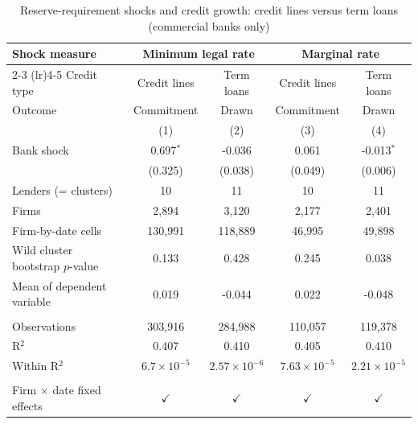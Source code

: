 
\begin{table}[!h]
   \centering
   \small
   \begin{threeparttable}[b]
      \caption{\label{tab:encaje_loan_growth_banks} Reserve-requirement shocks and credit growth: credit lines versus term loans (commercial banks only)}
      \bigskip
      \begin{tabular}{lcccc}
         \toprule
         Shock measure & \multicolumn{2}{c}{Minimum legal rate} & \multicolumn{2}{c}{Marginal rate} \\ 
         \cmidrule(lr){2-3} \cmidrule(lr){4-5}
         Credit type                       & Credit lines         & Term loans            & Credit lines          & Term loans \\   
         Outcome                           & Commitment           & Drawn                 & Commitment            & Drawn \\   
                                           & (1)                  & (2)                   & (3)                   & (4)\\  
         \midrule 
         Bank shock                        & 0.697$^{*}$          & -0.036                & 0.061                 & -0.013$^{*}$\\   
                                           & (0.325)              & (0.038)               & (0.049)               & (0.006)\\   
         Lenders (= clusters)              & 10                   & 11                    & 10                    & 11\\  
         Firms                             & 2,894                & 3,120                 & 2,177                 & 2,401\\  
         Firm-by-date cells                & 130,991              & 118,889               & 46,995                & 49,898\\  
         Wild cluster bootstrap $p$-value  & 0.133                & 0.428                 & 0.245                 & 0.038\\  
         Mean of dependent variable        & 0.019                & -0.044                & 0.022                 & -0.048\\  
          \\
         Observations                      & 303,916              & 284,988               & 110,057               & 119,378\\  
         R$^2$                             & 0.407                & 0.410                 & 0.405                 & 0.410\\  
         Within R$^2$                      & $6.7\times 10^{-5}$  & $2.57\times 10^{-6}$  & $7.63\times 10^{-5}$  & $2.21\times 10^{-5}$\\   
          \\
         Firm $\times$ date fixed effects  & $\checkmark$         & $\checkmark$          & $\checkmark$          & $\checkmark$\\   
         \bottomrule
      \end{tabular}
      

\end{threeparttable}
\end{table}
